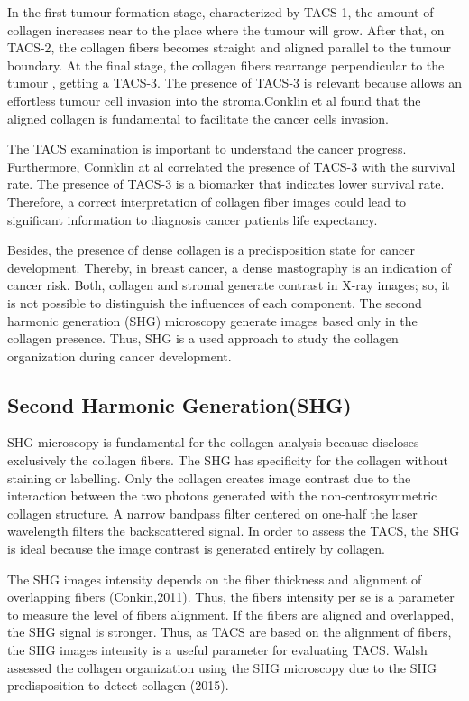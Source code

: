 \documentclass[12pt,a4paper]{article}
\begin{document}
In the first tumour formation stage, characterized by TACS-1, the amount of collagen increases near to the place where the tumour will grow. After that, on TACS-2, the collagen fibers becomes straight and aligned parallel to the tumour boundary.  At the final stage, the collagen fibers rearrange perpendicular to the tumour , getting a TACS-3. The presence of TACS-3 is relevant because allows an effortless tumour cell invasion into the stroma.Conklin et al found that the aligned collagen is fundamental to facilitate the cancer cells invasion. 

The TACS examination is important to understand the cancer progress. Furthermore, Connklin at al correlated the presence of TACS-3 with the survival rate. The presence of TACS-3 is a biomarker that indicates lower   survival rate. Therefore, a correct interpretation of  collagen fiber images could lead to significant information to diagnosis cancer patients life expectancy.

Besides, the presence of dense collagen is a predisposition state for  cancer development. Thereby, in breast cancer, a dense mastography is an indication of cancer risk. Both, collagen and  stromal generate contrast in X-ray images; so, it is not possible to distinguish the influences of each component. The second harmonic generation (SHG) microscopy generate images based only in the collagen presence. Thus, SHG is a used approach to study the collagen organization during cancer development.



\subsection{Second Harmonic Generation(SHG)}
SHG microscopy is fundamental for the collagen analysis because discloses exclusively the collagen fibers. The SHG has specificity for the collagen without staining or labelling. Only the collagen creates image contrast due to the interaction between the two photons generated with the non-centrosymmetric collagen structure. A narrow bandpass filter centered on one-half the laser wavelength filters the backscattered signal. In order to assess the TACS, the SHG is ideal because the image contrast is generated entirely by collagen. 

The SHG images intensity depends on the fiber thickness and alignment of overlapping fibers (Conkin,2011). Thus, the fibers intensity per se is a parameter to measure the level of fibers alignment. If the fibers are aligned and overlapped, the SHG signal is stronger. Thus, as TACS are based on the alignment of fibers, the SHG images intensity is a useful parameter for evaluating TACS. Walsh assessed the collagen organization using the SHG microscopy due to the SHG predisposition to detect collagen (2015).
\end{document}
